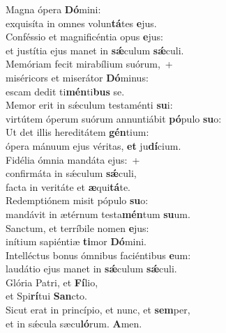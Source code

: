 \evenverse Magna ópera \textbf{Dó}mini:~\*\\
\evenverse exquisíta in omnes volun\textbf{tá}tes \textbf{e}jus.\\
\oddverse Conféssio et magnificéntia opus \textbf{e}jus:~\*\\
\oddverse et justítia ejus manet in \textbf{sǽ}culum \textbf{sǽ}culi.\\
\evenverse Memóriam fecit mirabílium suórum,~+\\
\evenverse  miséricors et miserátor \textbf{Dó}minus:~\*\\
\evenverse escam dedit ti\textbf{mén}ti\textbf{bus} se.\\
\oddverse Memor erit in sǽculum testaménti \textbf{su}i:~\*\\
\oddverse virtútem óperum suórum annuntiábit \textbf{pó}pulo \textbf{su}o:\\
\evenverse Ut det illis hereditátem \textbf{gén}tium:~\*\\
\evenverse ópera mánuum ejus véritas, \textbf{et} ju\textbf{dí}cium.\\
\oddverse Fidélia ómnia mandáta ejus:~+\\
\oddverse  confirmáta in sǽculum \textbf{sǽ}culi,~\*\\
\oddverse facta in veritáte et \textbf{æ}qui\textbf{tá}te.\\
\evenverse Redemptiónem misit pópulo \textbf{su}o:~\*\\
\evenverse mandávit in ætérnum testa\textbf{mén}tum \textbf{su}um.\\
\oddverse Sanctum, et terríbile nomen \textbf{e}jus:~\*\\
\oddverse inítium sapiéntiæ \textbf{ti}mor \textbf{Dó}mini.\\
\evenverse Intelléctus bonus ómnibus faciéntibus \textbf{e}um:~\*\\
\evenverse laudátio ejus manet in \textbf{sǽ}culum \textbf{sǽ}culi.\\
\oddverse Glória Patri, et \textbf{Fí}lio,~\*\\
\oddverse et Spi\textbf{rí}tui \textbf{San}cto.\\
\evenverse Sicut erat in princípio, et nunc, et \textbf{sem}per,~\*\\
\evenverse et in sǽcula sæcu\textbf{ló}rum. \textbf{A}men.\\
